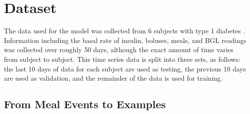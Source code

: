 \documentclass{ecai}
\begin{document}




\section{Dataset}

The data used for the model was collected from 6 subjects with type 1 diabetes \cite{ohiot1dm:marling:kdh18}.  Information including the basal rate of insulin, boluses, meals, and BGL readings was collected over roughly 50 days, although the exact amount of time varies from subject to subject.  This time series data is split into three sets, as follows: the last 10 days of data for each subject are used as testing, the previous 10 days are used as validation, and the remainder of the data is used for training.

\subsection{From Meal Events to Examples }
\end{document}
